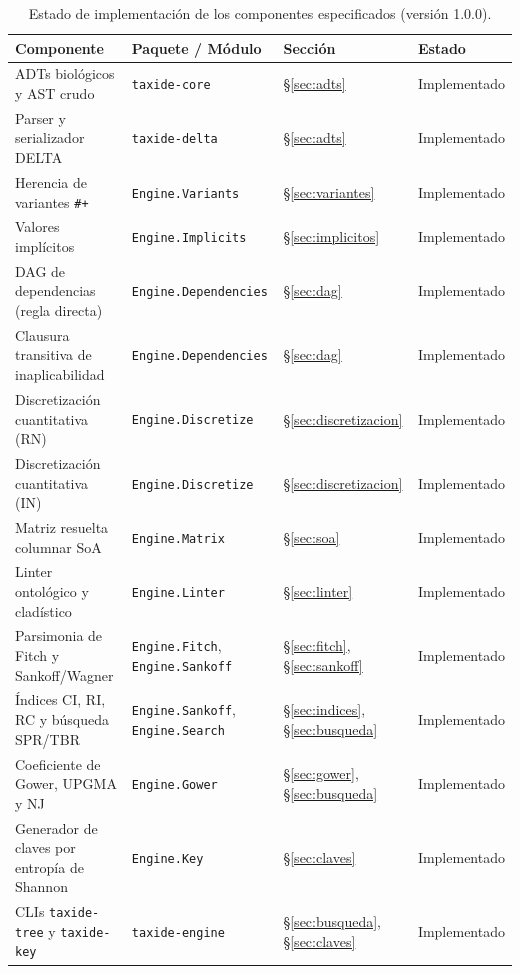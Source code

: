 \documentclass[11pt,a4paper]{article}
\newcommand{\taxideversion}{1.0.0}
\theoremstyle{definition}
\theoremstyle{remark}
\begin{document}
\begin{table}[ht]
\centering
\small
\caption{Estado de implementación de los componentes especificados (versión \taxideversion).}
\label{tab:estado}
\begin{tabularx}{\textwidth}{@{}X l l l@{}}
\toprule
\textbf{Componente} & \textbf{Paquete / Módulo} & \textbf{Sección} & \textbf{Estado} \\
\midrule
ADTs biológicos y AST crudo & \texttt{taxide-core} & \S\ref{sec:adts} & Implementado \\
Parser y serializador DELTA & \texttt{taxide-delta} & \S\ref{sec:adts} & Implementado \\
Herencia de variantes \texttt{\#+} & \texttt{Engine.Variants} & \S\ref{sec:variantes} & Implementado \\
Valores implícitos & \texttt{Engine.Implicits} & \S\ref{sec:implicitos} & Implementado \\
DAG de dependencias (regla directa) & \texttt{Engine.Dependencies} & \S\ref{sec:dag} & Implementado \\
Clausura transitiva de inaplicabilidad & \texttt{Engine.Dependencies} & \S\ref{sec:dag} & Implementado \\
Discretización cuantitativa (RN) & \texttt{Engine.Discretize} & \S\ref{sec:discretizacion} & Implementado \\
Discretización cuantitativa (IN) & \texttt{Engine.Discretize} & \S\ref{sec:discretizacion} & Implementado \\
Matriz resuelta columnar SoA & \texttt{Engine.Matrix} & \S\ref{sec:soa} & Implementado \\
Linter ontológico y cladístico & \texttt{Engine.Linter} & \S\ref{sec:linter} & Implementado \\
Parsimonia de Fitch y Sankoff/Wagner & \texttt{Engine.Fitch}, \texttt{Engine.Sankoff} & \S\ref{sec:fitch}, \S\ref{sec:sankoff} & Implementado \\
Índices CI, RI, RC y búsqueda SPR/TBR & \texttt{Engine.Sankoff}, \texttt{Engine.Search} & \S\ref{sec:indices}, \S\ref{sec:busqueda} & Implementado \\
Coeficiente de Gower, UPGMA y NJ & \texttt{Engine.Gower} & \S\ref{sec:gower}, \S\ref{sec:busqueda} & Implementado \\
Generador de claves por entropía de Shannon & \texttt{Engine.Key} & \S\ref{sec:claves} & Implementado \\
CLIs \texttt{taxide-tree} y \texttt{taxide-key} & \texttt{taxide-engine} & \S\ref{sec:busqueda}, \S\ref{sec:claves} & Implementado \\

\end{tabularx}
\end{table}
\end{document}

